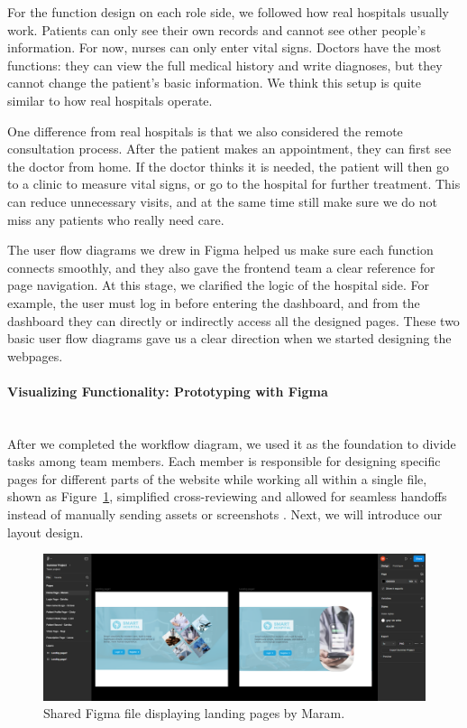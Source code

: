 For the function design on each role side, we followed how real hospitals usually work. 
Patients can only see their own records and cannot see other people’s information. 
For now, nurses can only enter vital signs. 
Doctors have the most functions: they can view the full medical history and write diagnoses, 
but they cannot change the patient’s basic information. 
We think this setup is quite similar to how real hospitals operate. 

One difference from real hospitals is that we also considered the remote consultation process. 
After the patient makes an appointment, they can first see the doctor from home. 
If the doctor thinks it is needed, the patient will then go to a clinic to measure vital signs, 
or go to the hospital for further treatment. 
This can reduce unnecessary visits, and at the same time still make sure we do not miss any patients who really need care. 

The user flow diagrams we drew in Figma helped us make sure each function connects smoothly, 
and they also gave the frontend team a clear reference for page navigation. 
At this stage, we clarified the logic of the hospital side. 
For example, the user must log in before entering the dashboard, 
and from the dashboard they can directly or indirectly access all the designed pages. 
These two basic user flow diagrams gave us a clear direction when we started designing the webpages.

\paragraph{Visualizing Functionality: Prototyping with Figma}\mbox{}\\
After we completed the workflow diagram, we used it as the foundation to divide tasks among team members. Each member is responsible for designing specific pages for different parts of the website while working all within a single file, shown as Figure~\ref{fig:3-2-2-DS-figma-f1}, simplified cross-reviewing and allowed for seamless handoffs instead of manually sending assets or screenshots . Next, we will introduce our layout design.
\begin{figure}[H]
  \centering
  \includegraphics[width=0.8\linewidth]{images03/3-2-2-figure1.png} 
  \caption{Shared Figma file displaying landing pages by Maram.}
  \label{fig:3-2-2-DS-figma-f1}
\end{figure}

